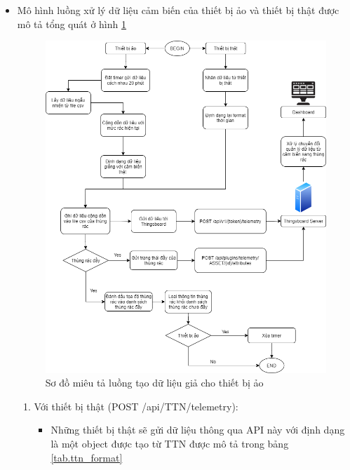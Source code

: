 \begin{itemize}
    \item Mô hình luồng xử lý dữ liệu cảm biến của thiết bị ảo và thiết bị thật được mô tả tổng quát ở hình \ref{fig:random_telemetry}
    \begin{figure}[H]
        \centering
        \includegraphics[width=\textwidth]{images/Khanh/Nodejs/Server_Random_Telemetry.png}
        \caption{Sơ đồ miêu tả luồng tạo dữ liệu giả cho thiết bị ảo}
        \label{fig:random_telemetry}
    \end{figure}   
    \begin{enumerate}
        \item Với thiết bị thật (POST /api/TTN/telemetry): 
        \begin{itemize}
            \item Những thiết bị thật sẽ gửi dữ liệu thông qua API này với định dạng là một object được tạo từ TTN được mô tả trong bảng \ref{tab.ttn_format}
            \begin{table}[H]
                \centering

\end{table}
\end{itemize}
\end{enumerate}
\end{itemize}
